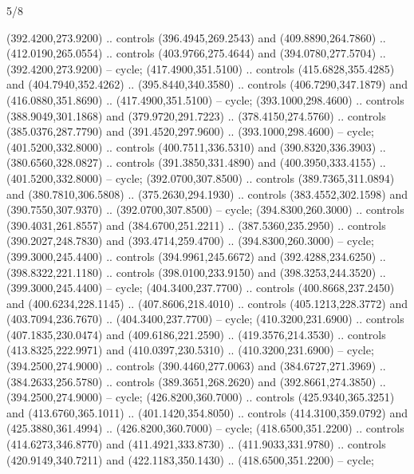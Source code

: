 \begin{flagdescription}{5/8}
\begin{scope}[shift={(0.5\flaglength,0.5\flagwidth)},scale=\flagwidth*\stretchfactor/820]
\begin{scope}[scale=1.84,xshift=-135mm,yshift=84mm]
\begin{scope}[y=0.80pt, x=0.80pt, yscale=-1, xscale=1]
\begin{scope}[cm={{1.01416,0.0,0.0,1.033,(-6.79641,-9.89449)}}]
\begin{scope}[draw=c24420e]
\begin{scope}[line width=0.131\lw]
\begin{scope}[fill=c406325]
\end{scope}
\begin{scope}[fill=c67923d]
 (392.4200,273.9200) .. controls (396.4945,269.2543) and
  (409.8890,264.7860) .. (412.0190,265.0554) .. controls (403.9766,275.4644) and
  (394.0780,277.5704) .. (392.4200,273.9200) -- cycle;
 (417.4900,351.5100) .. controls (415.6828,355.4285) and
  (404.7940,352.4262) .. (395.8440,340.3580) .. controls (406.7290,347.1879) and
  (416.0880,351.8690) .. (417.4900,351.5100) -- cycle;
 (393.1000,298.4600) .. controls (388.9049,301.1868) and
  (379.9720,291.7223) .. (378.4150,274.5760) .. controls (385.0376,287.7790) and
  (391.4520,297.9600) .. (393.1000,298.4600) -- cycle;
 (401.5200,332.8000) .. controls (400.7511,336.5310) and
  (390.8320,336.3903) .. (380.6560,328.0827) .. controls (391.3850,331.4890) and
  (400.3950,333.4155) .. (401.5200,332.8000) -- cycle;
 (392.0700,307.8500) .. controls (389.7365,311.0894) and
  (380.7810,306.5808) .. (375.2630,294.1930) .. controls (383.4552,302.1598) and
  (390.7550,307.9370) .. (392.0700,307.8500) -- cycle;
 (394.8300,260.3000) .. controls (390.4031,261.8557) and
  (384.6700,251.2211) .. (387.5360,235.2950) .. controls (390.2027,248.7830) and
  (393.4714,259.4700) .. (394.8300,260.3000) -- cycle;
 (399.3000,245.4400) .. controls (394.9961,245.6672) and
  (392.4288,234.6250) .. (398.8322,221.1180) .. controls (398.0100,233.9150) and
  (398.3253,244.3520) .. (399.3000,245.4400) -- cycle;
 (404.3400,237.7700) .. controls (400.8668,237.2450) and
  (400.6234,228.1145) .. (407.8606,218.4010) .. controls (405.1213,228.3772) and
  (403.7094,236.7670) .. (404.3400,237.7700) -- cycle;
 (410.3200,231.6900) .. controls (407.1835,230.0474) and
  (409.6186,221.2590) .. (419.3576,214.3530) .. controls (413.8325,222.9971) and
  (410.0397,230.5310) .. (410.3200,231.6900) -- cycle;
 (394.2500,274.9000) .. controls (390.4460,277.0063) and
  (384.6727,271.3969) .. (384.2633,256.5780) .. controls (389.3651,268.2620) and
  (392.8661,274.3850) .. (394.2500,274.9000) -- cycle;
 (426.8200,360.7000) .. controls (425.9340,365.3251) and
  (413.6760,365.1011) .. (401.1420,354.8050) .. controls (414.3100,359.0792) and
  (425.3880,361.4994) .. (426.8200,360.7000) -- cycle;
 (418.6500,351.2200) .. controls (414.6273,346.8770) and
  (411.4921,333.8730) .. (411.9033,331.9780) .. controls (420.9149,340.7211) and
  (422.1183,350.1430) .. (418.6500,351.2200) -- cycle;

\end{scope}
\end{scope}
\end{scope}
\end{scope}
\end{scope}
\end{scope}
\end{scope}
\end{flagdescription}
